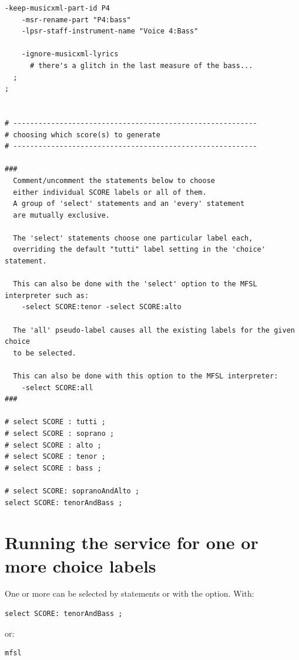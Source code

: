 \begin{lstlisting}[language=MFSL]
    -keep-musicxml-part-id P4
    -msr-rename-part "P4:bass"
    -lpsr-staff-instrument-name "Voice 4:Bass"

    -ignore-musicxml-lyrics
      # there's a glitch in the last measure of the bass...
  ;
;


# ----------------------------------------------------------
# choosing which score(s) to generate
# ----------------------------------------------------------

###
  Comment/uncomment the statements below to choose
  either individual SCORE labels or all of them.
  A group of 'select' statements and an 'every' statement
  are mutually exclusive.

  The 'select' statements choose one particular label each,
  overriding the default "tutti" label setting in the 'choice' statement.

  This can also be done with the 'select' option to the MFSL interpreter such as:
    -select SCORE:tenor -select SCORE:alto

  The 'all' pseudo-label causes all the existing labels for the given choice
  to be selected.

  This can also be done with this option to the MFSL interpreter:
    -select SCORE:all
###

# select SCORE : tutti ;
# select SCORE : soprano ;
# select SCORE : alto ;
# select SCORE : tenor ;
# select SCORE : bass ;

# select SCORE: sopranoAndAlto ;
select SCORE: tenorAndBass ;
\end{lstlisting}


\section{Running the service for one or more choice labels}

One or more can be selected by \code{select]} statements or with the  option.
With:
\begin{lstlisting}[language=MFSL]
select SCORE: tenorAndBass ;
\end{lstlisting}

 or:  %
\begin{lstlisting}[language=Terminal]
mfsl
\end{lstlisting}

